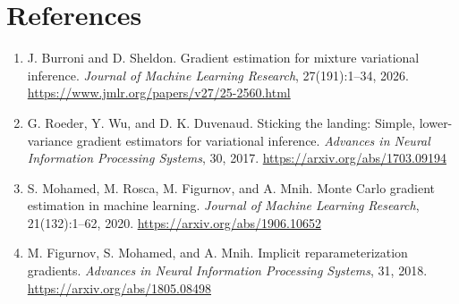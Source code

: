 \documentclass[11pt, a4paper]{article}
\begin{document}
\section*{References}
\begin{enumerate}

    \item J. Burroni and D. Sheldon.
    Gradient estimation for mixture variational inference.
    \emph{Journal of Machine Learning Research},
    27(191):1--34, 2026.\\
    \href{https://www.jmlr.org/papers/v27/25-2560.html}
    {https://www.jmlr.org/papers/v27/25-2560.html}

    \item G. Roeder, Y. Wu, and D. K. Duvenaud.
    Sticking the landing: Simple, lower-variance gradient
    estimators for variational inference.
    \emph{Advances in Neural Information Processing Systems},
    30, 2017.
    \href{https://arxiv.org/abs/1703.09194}
    {https://arxiv.org/abs/1703.09194}

    \item S. Mohamed, M. Rosca, M. Figurnov, and A. Mnih.
    Monte Carlo gradient estimation in machine learning.
    \emph{Journal of Machine Learning Research},
    21(132):1--62, 2020.
    \href{https://arxiv.org/abs/1906.10652}
    {https://arxiv.org/abs/1906.10652}

    \item M. Figurnov, S. Mohamed, and A. Mnih.
    Implicit reparameterization gradients.
    \emph{Advances in Neural Information Processing Systems},
    31, 2018. \\
    \href{https://arxiv.org/abs/1805.08498}
    {https://arxiv.org/abs/1805.08498}

\end{enumerate}
\end{document}
